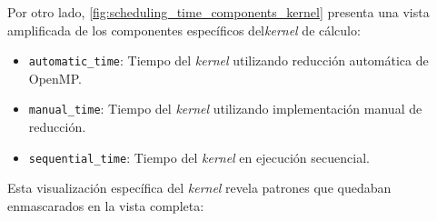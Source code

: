         Por otro lado, \autoref{fig:scheduling_time_components_kernel} presenta una vista amplificada de los componentes específicos del\textit{kernel} de cálculo:
        
        \begin{itemize}
        
            \item \texttt{automatic\_time}: Tiempo del \textit{kernel} utilizando reducción automática de OpenMP.
            
            \item \texttt{manual\_time}: Tiempo del \textit{kernel} utilizando implementación manual de reducción.
            
            \item \texttt{sequential\_time}: Tiempo del \textit{kernel} en ejecución secuencial.
            
        \end{itemize}
    
        Esta visualización específica del \textit{kernel} revela patrones que quedaban enmascarados en la vista completa:
    
